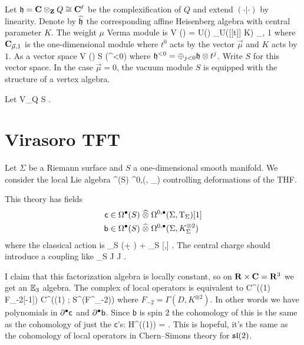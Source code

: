 \documentclass[11pt]{amsart}
\newcommand{\sfb}{\mathsf{b}}
\newcommand{\sfc}{\mathsf{c}}
\begin{document}
Let $\mathfrak{h} = \mathbf{C} \otimes_{\mathbf{Z}} Q \cong \mathbf{C}^\ell$ be the complexification of $Q$ and extend $(\cdot|\cdot)$ by linearity.
Denote by $\widehat{\mathfrak{h}}$ the corresponding affine Heisenberg algebra with central parameter $K$.
The weight $\mu$ Verma module is
\beqn
\til V (\vec{\mu}) = U() \otimes_{U([[t]] \oplus \C K)} \C_{\mu, 1}
\eeqn
where $\mathbf{C}_{\vec{\mu},1}$ is the one-dimensional module where $t^0$ acts by the vector $\vec{\mu}$ and $K$ acts by $1$.
As a vector space
\beqn
\til V (\vec{\mu}) \simeq S \left(^{<0}\right)
\eeqn
where $\mathfrak{h}^{<0} = \oplus_{j < 0} \mathfrak{h} \otimes t^j$.
Write $S$ for this vector space.
In the case $\vec{\mu} = 0$, the vacuum module $S$ is equipped with the structure of a vertex algebra.

Let 
\beqn
V_Q  S \otimes \C[Q] .
\eeqn

\section{Virasoro TFT}

Let $\Sigma$ be a Riemann surface and $S$ a one-dimensional smooth manifold.
We consider the local Lie algebra
\beqn
\Omega^\bu(S) \hotimes \Omega^{0,\bu}(\Sigma, \T_{\Sigma}) 
\eeqn
controlling deformations of the THF.

This theory has fields
\begin{align*}
\sfc & \in \Omega^\bu(S) \hotimes \Omega^{0,\bu}(\Sigma, \T_\Sigma)[1] \\
\sfb & \in \Omega^\bu(S) \hotimes \Omega^{0,\bu}(\Sigma, K_\Sigma^{\otimes 2})
\end{align*}
where the classical action is 
\beqn
\int_{S \times \Sigma} \sfb (\d + \dbar) \sfc +  \int_{S \times \Sigma} \sfb [\sfc,\sfc] .
\eeqn
The central charge should introduce a coupling like
\beqn
\int_{S \times \C} J \sfc \del J \sfc .
\eeqn

I claim that this factorization algebra is locally constant, so on $\mathbf{R} \times \mathbf{C} = \mathbf{R}^3$ we get an $\mathbb E_3$ algebra.
The complex of local operators is equivalent to
\beqn
C^\bu((1) \oplus F_{-2}[-1]) \simeq C^\bu((1) ; S^\bu \left(F^\vee_{-2}\right))
\eeqn
where $F_{-2} = \Gamma(D, K^{\otimes 2})$.
In other words we have polynomials in $\del^\bu \sfc$ and $\del^\bu \sfb$.
Since $\sfb$ is spin $2$ the cohomology of this is the same as the cohomology of just the $\sfc$'s:
\beqn
H^\bu((1)) = \C \oplus \C[-3] .
\eeqn
This is hopeful, it's the same as the cohomology of local operators in Chern--Simons theory for $\mathfrak{sl}(2)$.
\end{document}
